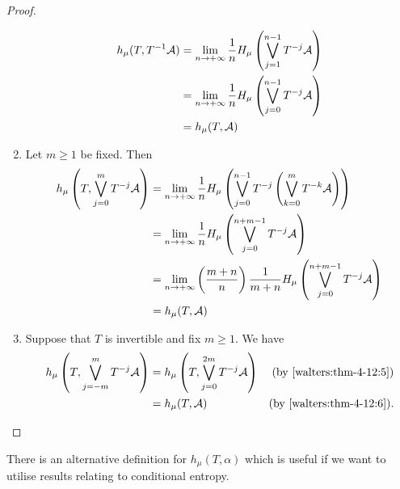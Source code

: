 \begin{theorem}
\begin{proof}
\begin{enumerate}
\begin{align*}
					h_\mu(T, T^{-1}{\mathcal{A}}) &= \lim_{n \to +\infty}{\frac{1}{n} H_\mu\left(\bigvee_{j = 1}^{n - 1}{T^{-j}{\mathcal{A}}}\right)} \\
						&= \lim_{n \to +\infty}{\frac{1}{n} H_\mu\left(\bigvee_{j = 0}^{n - 1}{T^{-j}{\mathcal{A}}}\right)} \\
						&= h_\mu(T, \mathcal{A})
				\end{align*}
			\item Let $m \geq 1$ be fixed. Then
				\begin{align*}
					h_\mu\left(T, \bigvee_{j = 0}^{m}{T^{-j}{\mathcal{A}}}\right) &= \lim_{n \to +\infty}{\frac{1}{n} H_\mu\left(\bigvee_{j = 0}^{n - 1}{T^{-j}\left(\bigvee_{k = 0}^{m}{T^{-k}{\mathcal{A}}}\right)}\right)} \\
						&= \lim_{n \to +\infty}{\frac{1}{n} H_\mu\left(\bigvee_{j = 0}^{n + m - 1}{T^{-j}{\mathcal{A}}}\right)} \\
						&= \lim_{n \to +\infty}{\left(\frac{m + n}{n}\right) \frac{1}{m + n} H_\mu\left(\bigvee_{j = 0}^{n + m - 1}{T^{-j}{\mathcal{A}}}\right)} \\
						&= h_\mu(T, \mathcal{A})
				\end{align*}
			\item Suppose that $T$ is invertible and fix $m \geq 1$. We have
				\begin{align*}
					h_\mu\left(T, \bigvee_{j = -m}^{m}{T^{-j}{\mathcal{A}}}\right) &= h_\mu\left(T, \bigvee_{j = 0}^{2m}{T^{-j}{\mathcal{A}}}\right) & \text{(by \ref{walters:thm-4-12:5})} \\
						&= h_\mu(T, \mathcal{A}) & \text{(by \ref{walters:thm-4-12:6}).}
				\end{align*}
		\end{enumerate}
	\end{proof}
\end{theorem}

There is an alternative definition for $h_\mu(T, \alpha)$ which is useful if we want to utilise results relating to conditional entropy.

